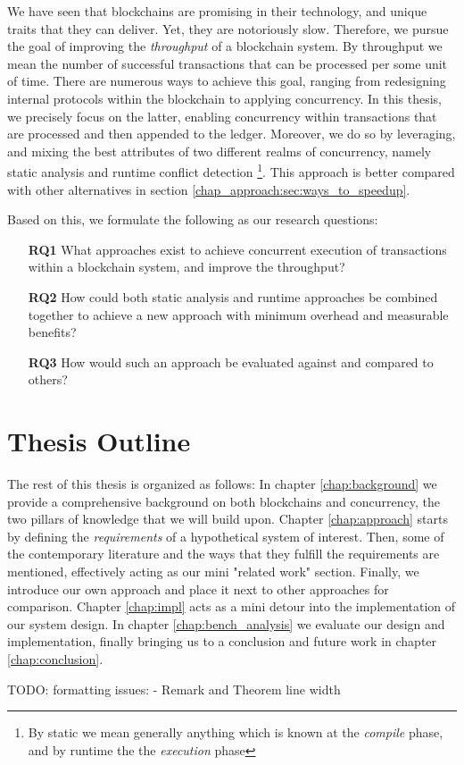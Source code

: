 We have seen that blockchains are promising in their technology, and unique traits that they can
deliver. Yet, they are notoriously slow. Therefore, we pursue the goal of improving the
\textit{throughput} of a blockchain system. By throughput we mean the number of successful
transactions that can be processed per some unit of time. There are numerous ways to
achieve this goal, ranging from redesigning internal protocols within the blockchain to applying
concurrency. In this thesis, we precisely focus on the latter, enabling concurrency within
transactions that are processed and then appended to the ledger. Moreover, we do so by leveraging,
and mixing the best attributes of two different realms of concurrency, namely static analysis and
runtime conflict detection \footnote{By static we mean generally anything which is known at the
\textit{compile} phase, and by runtime the the \textit{execution} phase}. This approach is better
compared with other alternatives in section \ref{chap_approach:sec:ways_to_speedup}.

Based on this, we formulate the following as our research questions:

 \begin{enumerate}
	\item [\textbf{RQ1}] What approaches exist to achieve concurrent execution of transactions
	within a blockchain system, and improve the throughput?

	\item [\textbf{RQ2}] How could both static analysis and runtime approaches be combined together
	to achieve a new approach with minimum overhead and measurable benefits?

	\item [\textbf{RQ3}] How would such an approach be evaluated against and compared to others?
 \end{enumerate}

\section{Thesis Outline}
The rest of this thesis is organized as follows: In chapter \ref{chap:background} we provide a
comprehensive background on both blockchains and concurrency, the two pillars of knowledge that we
will build upon. Chapter \ref{chap:approach} starts by defining the \textit{requirements} of a
hypothetical system of interest. Then, some of the contemporary literature and the ways that they
fulfill the requirements are mentioned, effectively acting as our mini "related work" section.
Finally, we introduce our own approach and place it next to other approaches for comparison. Chapter
\ref{chap:impl} acts as a mini detour into the implementation of our system design. In chapter
\ref{chap:bench_analysis} we evaluate our design and implementation, finally bringing us to a
conclusion and future work in chapter \ref{chap:conclusion}.

TODO: formatting issues:
- Remark and Theorem line width

